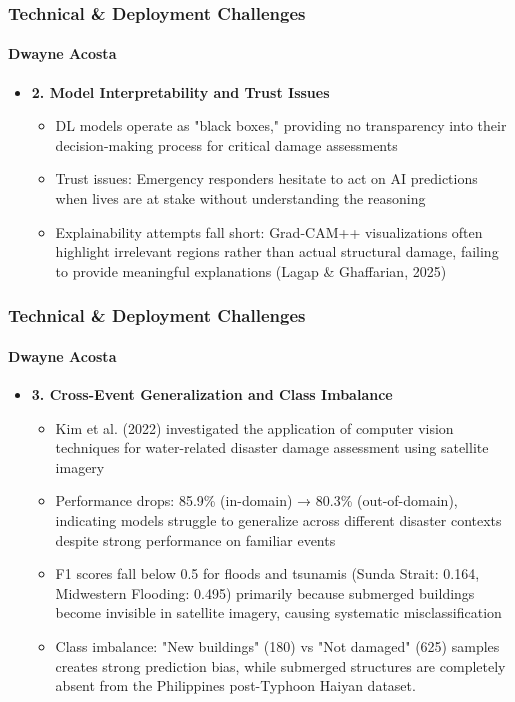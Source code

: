 \documentclass{beamer}
\newcommand{\namedframe}[3]{
  \begin{frame}
    \frametitle{#2}
    \framesubtitle{#1}
    #3
  \end{frame}
}
\begin{document}
\namedframe{Dwayne Acosta}{Technical \& Deployment Challenges}{
\begin{itemize}
    \item \textbf{2. Model Interpretability and Trust Issues}
    \begin{itemize}
        \item DL models operate as "black boxes," providing no transparency into their decision-making process for critical damage assessments
        \item Trust issues: Emergency responders hesitate to act on AI predictions when lives are at stake without understanding the reasoning
        \item Explainability attempts fall short: Grad-CAM++ visualizations often highlight irrelevant regions rather than actual structural damage, failing to provide meaningful explanations (Lagap \& Ghaffarian, 2025)
    \end{itemize}
\end{itemize}
}


\namedframe{Dwayne Acosta}{Technical \& Deployment Challenges}{
\begin{itemize}
    \item \textbf{3. Cross-Event Generalization and Class Imbalance}
    \begin{itemize}
      \item Kim et al. (2022) investigated the application of computer vision techniques for water-related disaster damage assessment using satellite imagery
      \item Performance drops: 85.9\% (in-domain) → 80.3\% (out-of-domain), indicating models struggle to generalize across different disaster contexts despite strong performance on familiar events
      \item F1 scores fall below 0.5 for floods and tsunamis (Sunda Strait: 0.164, Midwestern Flooding: 0.495) primarily because submerged buildings become invisible in satellite imagery, causing systematic misclassification
      \item Class imbalance: "New buildings" (180) vs "Not damaged" (625) samples creates strong prediction bias, while submerged structures are completely absent from the Philippines post-Typhoon Haiyan dataset.
    \end{itemize}
\end{itemize}
}
\end{document}
